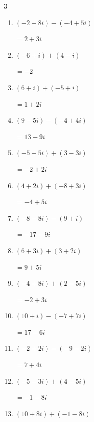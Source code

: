 \begin{multicols}{3}
\begin{enumerate}
        $\displaystyle =4+11i$

  \item $\displaystyle (-2+8i) - (-4+5i)$

        $\displaystyle =2+3i$

\columnbreak %

\resetques

  \item $\displaystyle (-6+i) + (4-i)$

        $\displaystyle =-2$

  \item $\displaystyle (6+i) + (-5+i)$

        $\displaystyle =1+2i$

  \item $\displaystyle (9-5i) - (-4+4i)$

        $\displaystyle =13-9i$

  \item $\displaystyle (-5+5i) + (3-3i)$

        $\displaystyle =-2+2i$

  \item $\displaystyle (4+2i) + (-8+3i)$

        $\displaystyle =-4+5i$

  \item $\displaystyle (-8-8i) - (9+i)$

        $\displaystyle =-17-9i$

  \item $\displaystyle (6+3i) + (3+2i)$

        $\displaystyle =9+5i$

  \item $\displaystyle (-4+8i) + (2-5i)$

        $\displaystyle =-2+3i$

  \item $\displaystyle (10+i) - (-7+7i)$

        $\displaystyle =17-6i$

  \item $\displaystyle (-2+2i) - (-9-2i)$

        $\displaystyle =7+4i$

  \item $\displaystyle (-5-3i) + (4-5i)$

        $\displaystyle =-1-8i$

  \item $\displaystyle (10+8i) + (-1-8i)$


\end{enumerate}
\end{multicols}
